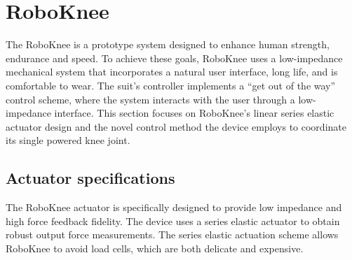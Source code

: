



% 
\section{RoboKnee}

The RoboKnee is a prototype system designed to enhance human strength, endurance and speed.  To achieve these goals, RoboKnee uses a low-impedance mechanical system that incorporates a natural user interface, long life, and is comfortable to wear.  The suit's controller implements a ``get out of the way'' control scheme, where the system interacts with the user through a low-impedance interface.  This section focuses on RoboKnee's linear series elastic actuator design and the novel control method the device employs to coordinate its single powered knee joint.

\subsection{Actuator specifications}

The RoboKnee actuator is specifically designed to provide low impedance and high force feedback fidelity.  The device uses a series elastic actuator to obtain robust output force measurements.  The series elastic actuation scheme allows RoboKnee to avoid load cells, which are both delicate and expensive.

